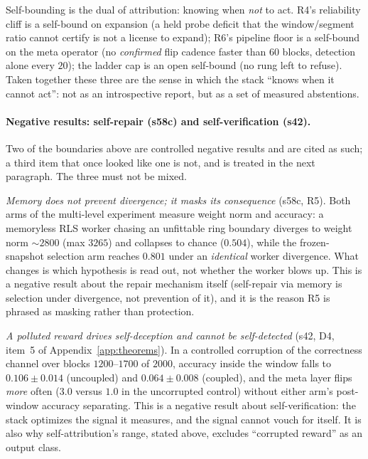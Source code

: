 \documentclass[preprint,12pt]{elsarticle}
\begin{document}
Self-bounding is the dual of attribution: knowing when \emph{not} to act.
R4's reliability cliff is a self-bound on expansion (a held probe deficit
that the window/segment ratio cannot certify is not a license to expand);
R6's pipeline floor is a self-bound on the meta operator (no \emph{confirmed}
flip cadence
faster than $60$ blocks, detection alone every $20$); the ladder cap is an open self-bound (no rung left
to refuse). Taken together these three are the sense in which the stack
``knows when it cannot act'': not as an introspective report, but as a set
of measured abstentions.

\paragraph{Negative results: self-repair (s58c) and self-verification (s42).}
Two of the boundaries above are controlled negative results and are cited as
such; a third item that once looked like one is not, and is treated in the
next paragraph. The three must not be mixed.

\emph{Memory does not prevent divergence; it masks its consequence}
(s58c, R5). Both arms of the multi-level experiment measure weight norm and
accuracy: a memoryless RLS worker chasing an unfittable ring boundary
diverges to weight norm $\sim2800$ (max $3265$) and collapses to chance
($0.504$), while the frozen-snapshot selection arm reaches $0.801$ under an
\emph{identical} worker divergence. What changes is which hypothesis is read
out, not whether the worker blows up. This is a negative result about the
repair mechanism itself (self-repair via memory is selection under
divergence, not prevention of it), and it is the reason R5 is phrased as
masking rather than protection.

\emph{A polluted reward drives self-deception and cannot be self-detected}
(s42, D4, item~5 of Appendix~\ref{app:theorems}). In a controlled
corruption of the correctness channel over blocks $1200$--$1700$ of $2000$,
accuracy inside the window falls to $0.106\pm0.014$ (uncoupled) and
$0.064\pm0.008$ (coupled), and the meta layer flips \emph{more} often
($3.0$ versus $1.0$ in the uncorrupted control) without either arm's
post-window accuracy separating. This is a negative result about
self-verification: the stack optimizes the signal it measures, and the
signal cannot vouch for itself. It is also why self-attribution's range,
stated above, excludes ``corrupted reward'' as an output class.
\end{document}
